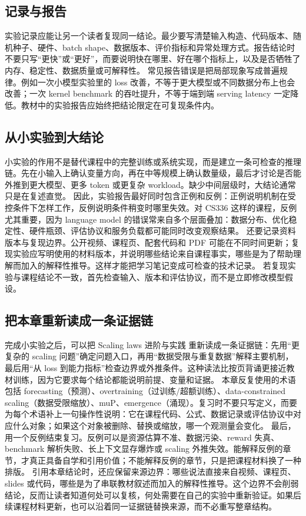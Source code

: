 \documentclass[a4paper]{article}
\begin{document}
\subsection{记录与报告}
实验记录应能让另一个读者复现同一结论。最少要写清楚输入构造、代码版本、随机种子、硬件、batch shape、数据版本、评价指标和异常处理方式。报告结论时不要只写“更快”或“更好”，而要说明快在哪里、好在哪个指标上，以及是否牺牲了内存、稳定性、数据质量或可解释性。
常见报告错误是把局部现象写成普遍规律。例如一次小模型实验里的 loss 改善，不等于更大模型或不同数据分布上也会改善；一次 kernel benchmark 的吞吐提升，不等于端到端 serving latency 一定降低。教材中的实验报告应始终把结论限定在可复现条件内。
\subsection{从小实验到大结论}
小实验的作用不是替代课程中的完整训练或系统实现，而是建立一条可检查的推理链。先在小输入上确认变量方向，再在中等规模上确认数量级，最后才讨论是否能外推到更大模型、更多 token 或更复杂 workload。缺少中间层级时，大结论通常只是在复述直觉。
因此，实验报告最好同时包含正例和反例：正例说明机制在受控条件下怎样工作，反例说明条件稍变时哪里失效。对 CS336 这样的课程，反例尤其重要，因为 language model 的错误常来自多个层面叠加：数据分布、优化稳定性、硬件瓶颈、评估协议和服务负载都可能同时改变观察结果。
还要记录资料版本与复现边界。公开视频、课程页、配套代码和 PDF 可能在不同时间更新；复现实验应写明使用的材料版本，并说明哪些结论来自课程事实，哪些是为了帮助理解而加入的解释性推导。这样才能把学习笔记变成可检查的技术记录。
若复现实验与课程结论不一致，首先检查输入、版本和评估协议，而不是立即修改模型假设。
\subsection{把本章重新读成一条证据链}
完成小实验之后，可以把 Scaling laws 进阶与实践 重新读成一条证据链：先用“更复杂的 scaling 问题”确定问题入口，再用“数据受限与重复数据”解释主要机制，最后用“从 loss 到能力指标”检查边界或外推条件。这种读法比按页背诵更接近教材训练，因为它要求每个结论都能说明前提、变量和证据。
本章反复使用的术语包括 forecasting（预测）、overtraining（过训练/超额训练）、data-constrained scaling（数据受限缩放）、muP、emergence（涌现）。复习时不要只写定义，而要为每个术语补上一句操作性说明：它在课程代码、公式、数据记录或评估协议中对应什么对象；如果这个对象被删除、替换或缩放，哪一个观测量会变化。
最后，用一个反例结束复习。反例可以是资源估算不准、数据污染、reward 失真、benchmark 解析失败、长上下文显存爆炸或 scaling 外推失效。能解释反例的章节，才真正具备自学和引用价值；不能解释反例的章节，只是把课程材料换了一种排版。
引用本章结论时，还应保留来源边界：哪些说法直接来自视频、课程页、slides 或代码，哪些是为了串联教材叙述而加入的解释性推导。这个边界不会削弱结论，反而让读者知道何处可以复核，何处需要在自己的实验中重新验证。如果后续课程材料更新，也可以沿着同一证据链替换来源，而不必重写整章结构。
\end{document}
